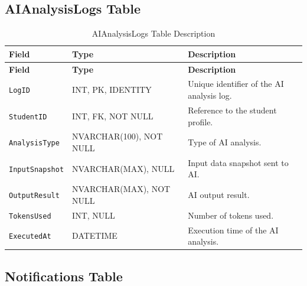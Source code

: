 \subsection{AIAnalysisLogs Table}

\begin{longtable}{|>{\raggedright\arraybackslash}m{2.9cm}|>{\raggedright\arraybackslash}m{3.45cm}|>{\raggedright\arraybackslash}m{4.95cm}|}
\caption{AIAnalysisLogs Table Description}
\label{tab:ai_analysis_logs_table_description}
\\
\hline
\textbf{Field} & \textbf{Type} & \textbf{Description} \\
\hline
\endfirsthead
\hline
\textbf{Field} & \textbf{Type} & \textbf{Description} \\
\hline
\endhead
\texttt{LogID} & INT, PK, IDENTITY & Unique identifier of the AI analysis log. \\
\hline
\texttt{StudentID} & INT, FK, NOT NULL & Reference to the student profile. \\
\hline
\texttt{AnalysisType} & NVARCHAR(100), NOT NULL & Type of AI analysis. \\
\hline
\texttt{InputSnapshot} & NVARCHAR(MAX), NULL & Input data snapshot sent to AI. \\
\hline
\texttt{OutputResult} & NVARCHAR(MAX), NOT NULL & AI output result. \\
\hline
\texttt{TokensUsed} & INT, NULL & Number of tokens used. \\
\hline
\texttt{ExecutedAt} & DATETIME & Execution time of the AI analysis. \\
\hline
\end{longtable}

\subsection{Notifications Table}

